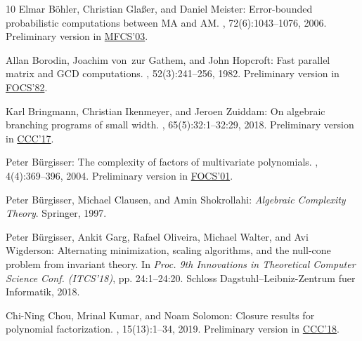 \documentclass[11pt]{article}
\numberwithin{equation}{section}
\theoremstyle{definition}
\theoremstyle{plain}
\begin{document}
\begin{thebibliography}{10}
{\sc Elmar B{\"o}hler, Christian Gla{\ss}er, and Daniel Meister}: Error-bounded
  probabilistic computations between {MA} and {AM}.
, 72(6):1043--1076, 2006.
\newblock Preliminary version in
  \href{https://link.springer.com/chapter/10.1007/978-3-540-45138-9_19}{MFCS'03}.

{\sc Allan Borodin, Joachim von~zur Gathem, and John Hopcroft}: Fast parallel
  matrix and {GCD} computations.
, 52(3):241--256, 1982.
\newblock Preliminary version in
  \href{https://ieeexplore.ieee.org/document/4568376}{FOCS'82}.
\newblock [\epfmtdoi{10.1016/S0019-9958(82)90766-5}]

{\sc Karl Bringmann, Christian Ikenmeyer, and Jeroen Zuiddam}: On algebraic
  branching programs of small width.
, 65(5):32:1--32:29, 2018.
\newblock Preliminary version in
  \href{http://drops.dagstuhl.de/opus/volltexte/2017/7521/}{CCC'17}.

{\sc Peter B{\"u}rgisser}: The complexity of factors of multivariate
  polynomials.
, 4(4):369--396, 2004.
\newblock Preliminary version in
  \href{https://doi.org/10.1109/SFCS.2001.959912}{FOCS'01}.
\newblock [\epfmtdoi{10.1007/s10208-002-0059-5}]

{\sc Peter B{\"u}rgisser, Michael Clausen, and Amin Shokrollahi}: {\em
  Algebraic Complexity Theory}.
\newblock Springer, 1997.
\newblock [\epfmtdoi{10.1007/978-3-662-03338-8}]

{\sc Peter B{\"u}rgisser, Ankit Garg, Rafael Oliveira, Michael Walter, and Avi
  Wigderson}: Alternating minimization, scaling algorithms, and the null-cone
  problem from invariant theory.
\newblock In {\em Proc. 9th Innovations in Theoretical Computer Science Conf.
  (ITCS'18)}, pp. 24:1--24:20. Schloss Dagstuhl--Leibniz-Zentrum fuer
  Informatik, 2018.

{\sc Chi-Ning Chou, Mrinal Kumar, and Noam Solomon}: Closure results for
  polynomial factorization.
, 15(13):1--34, 2019.
\newblock Preliminary version in
  \href{https://doi.org/10.4230/LIPIcs.CCC.2018.13}{CCC'18}.


\end{thebibliography}
\end{document}
